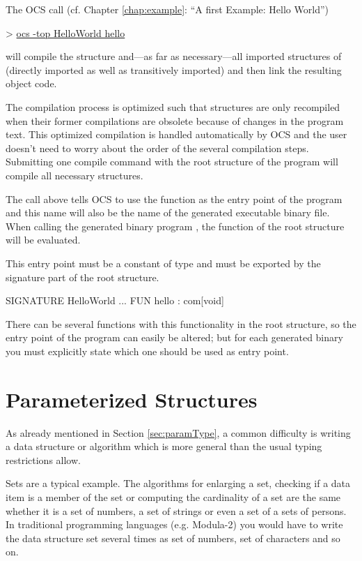The OCS call (cf. Chapter \ref{chap:example}: ``A first
Example: Hello World'')
\begin{prog}
      >  \underline{ocs -top HelloWorld hello}
\end{prog}
will compile the structure  and---as far as
necessary---all imported structures of  (directly
imported as well 
as transitively imported) and then link the resulting object code.

The compilation process is optimized such that structures are only
 recompiled when their former compilations are obsolete
because of changes in the program text.
This optimized compilation is handled automatically by OCS
and the user doesn't need to worry about the order of the several
compilation steps.
Submitting one compile command with the root structure of the program
will compile all necessary structures.
\medskip

The call above tells OCS to use the function
 as the entry point of the program and this name will also
be the name of the generated executable binary file.
When calling the generated binary program , the function
 of the root structure  will be evaluated.

\important This entry point must be a constant of type 
and must be exported by the signature part of the root structure.
\begin{prog}
          SIGNATURE HelloWorld
          ...
          FUN hello : com[void]
\end{prog}

There can be several functions with this functionality in the root
structure, so the entry point of the program can easily be altered;
 but for each
generated binary you must explicitly state which one should be used
as entry point.


\section{Parameterized Structures}
\label{sec:struct.param}
\advanced
 As already mentioned in Section \ref{sec:paramType}, a
common difficulty is  writing a data structure or algorithm which is more
general than the usual typing restrictions allow.

Sets are a typical example.
The algorithms for enlarging a set, checking if a data item is a member
of the set or computing the cardinality of a set are the same
whether it is a set of numbers, a set of strings or even a set
of a sets  of persons.
In traditional programming languages (e.g. Modula-2) you would have to
write the data structure set several times as set of numbers, set of
characters and so on.

